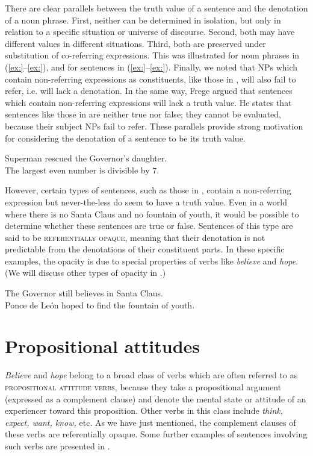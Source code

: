 There are clear parallels between the truth value of a sentence and the denotation of a noun phrase. First, neither can be determined in isolation, but only in relation to a specific situation or universe of discourse. Second, both may have different values in different situations. Third, both are preserved under substitution of co-referring expressions. This was illustrated for noun phrases in (\ref{ex:}--\ref{ex:}), and for sentences in (\ref{ex:}--\ref{ex:}). Finally, we noted that NPs which contain non-referring expressions as constituents, like those in , will also fail to refer, i.e. will lack a denotation. In the same way, Frege argued that sentences which contain non-referring expressions will lack a truth value. He states that sentences like those in  are neither true nor false; they cannot be evaluated, because their subject NPs fail to refer. These parallels provide strong motivation for considering the denotation of a sentence to be its truth value.


\ea
\ea Superman rescued the Governor’s daughter.\\
\ex The largest even number is divisible by 7.
                       \z
\z

However, certain types of sentences, such as those in , contain a non-referring expression but never-the-less do seem to have a truth value. Even in a world where there is no Santa Claus and no fountain of youth, it would be possible to determine whether these sentences are true or false. Sentences of this type are said to be \textsc{referentially opaque}, meaning that their denotation is not predictable from the denotations of their constituent parts. In these specific examples, the opacity is due to special properties of verbs like \textit{believe} and \textit{hope}. (We will discuss other types of opacity in .)

\ea
\ea The Governor still believes in Santa Claus.\\
\ex Ponce de León hoped to find the fountain of youth.
                       \z
\z

\section{Propositional attitudes}\label{sec:} %

\textit{Believe} and \textit{hope} belong to a broad class of verbs which are often referred to as \textsc{propositional attitude verbs}, because they take a propositional argument (expressed as a complement clause) and denote the mental state or attitude of an experiencer toward this proposition. Other verbs in this class include \textit{think, expect, want, know,} etc. As we have just mentioned, the complement clauses of these verbs are referentially opaque. Some further examples of sentences involving such verbs are presented in .


